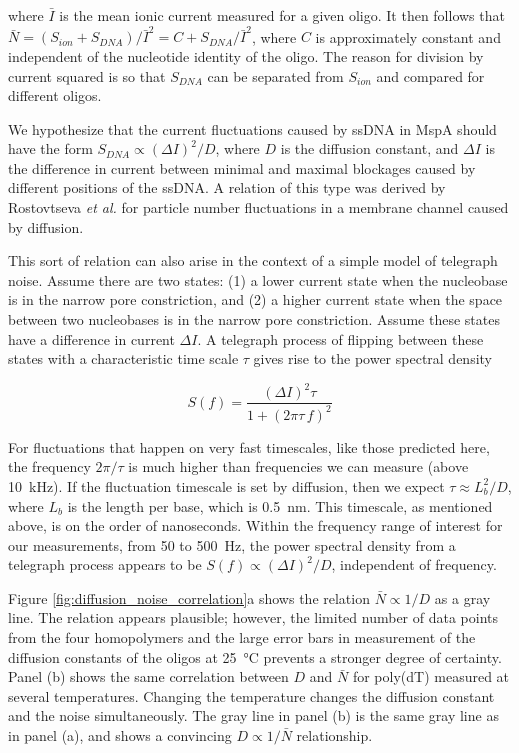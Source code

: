 \noindent
where $\bar{I}$ is the mean ionic current measured for a given oligo.  It then follows that $\bar{N} = (S_{ion}+S_{DNA})/\bar{I}^2 = C + S_{DNA}/\bar{I}^2$, where $C$ is approximately constant and independent of the nucleotide identity of the oligo.  The reason for division by current squared is so that $S_{DNA}$ can be separated from $S_{ion}$ and compared for different oligos.

We hypothesize that the current fluctuations caused by ssDNA in MspA should have the form $S_{DNA} \propto (\Delta I)^2/D$, where $D$ is the diffusion constant, and $\Delta I$ is the difference in current between minimal and maximal blockages caused by different positions of the ssDNA.  A relation of this type was derived by Rostovtseva \textit{et al.} \citep{Rostovtseva1998, Berezhkovskii2002, Rostovtseva2002} for particle number fluctuations in a membrane channel caused by diffusion.

This sort of relation can also arise in the context of a simple model of telegraph noise.  Assume there are two states: (1) a lower current state when the nucleobase is in the narrow pore constriction, and (2) a higher current state when the space between two nucleobases is in the narrow pore constriction.  Assume these states have a difference in current $\Delta I$.  A telegraph process of flipping between these states with a characteristic time scale $\tau$ gives rise to the power spectral density \citep{Dutta1981} 

\begin{equation}
S(f) = \frac{(\Delta I)^2 \tau}{1 + (2 \pi \tau \, f)^2}
\label{eqn:telegraph_noise}
\end{equation}

For fluctuations that happen on very fast timescales, like those predicted here, the frequency $2\pi/\tau$ is much higher than frequencies we can measure (above \SI{10}{\kHz}).  If the fluctuation timescale is set by diffusion, then we expect $\tau \approx L_b^2 / D$, where $L_b$ is the length per base, which is \SI{0.5}{\nm}.  This timescale, as mentioned above, is on the order of nanoseconds.  Within the frequency range of interest for our measurements, from \num{50} to \SI{500}{\Hz}, the power spectral density from a telegraph process appears to be $S(f) \propto (\Delta I)^2/D$, independent of frequency.

Figure \ref{fig:diffusion_noise_correlation}a shows the relation $\bar{N} \propto 1/D$ as a gray line.  The relation appears plausible; however, the limited number of data points from the four homopolymers and the large error bars in measurement of the diffusion constants of the oligos at \SI{25}{\celsius} prevents a stronger degree of certainty.  Panel (b) shows the same correlation between $D$ and $\bar{N}$ for poly(dT) measured at several temperatures.  Changing the temperature changes the diffusion constant and the noise simultaneously.  The gray line in panel (b) is the same gray line as in panel (a), and shows a convincing $D \propto 1 / \bar{N}$ relationship.

